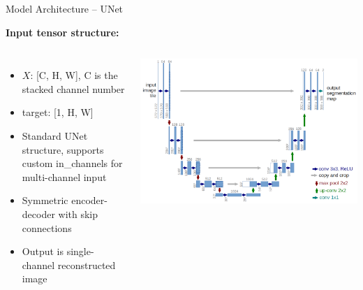 \documentclass{beamer}
\begin{document}
\begin{frame}{Model Architecture -- UNet}

\vspace{0.5em}
\textbf{Input tensor structure:}
\begin{columns}
\begin{itemize}
    \item $X$: [C, H, W], C is the stacked channel number
    \item target: [1, H, W]

    \item Standard UNet structure, supports custom in\_channels for multi-channel input
    \item Symmetric encoder-decoder with skip connections
    \item Output is single-channel reconstructed image
\end{itemize}
\includegraphics[width=1\linewidth]{u-net-architecture.png}
\end{columns}


\end{frame}
\end{document}
